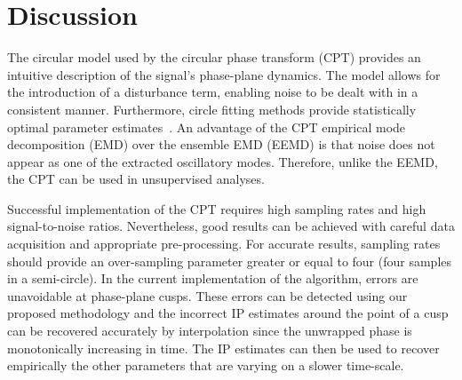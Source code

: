 \documentclass[11pt,draftcls,onecolumn]{IEEEtran}
\begin{document}
\section{Discussion}\label{sect:DiscussionSection}

The circular model used by the circular phase transform (CPT) provides an intuitive description of the signal's phase-plane dynamics. The model allows for the introduction of a disturbance term, enabling noise to be dealt with in a consistent manner. Furthermore, circle fitting methods provide statistically optimal parameter estimates~\cite{Al-Sharadqah2009}. An advantage of the CPT empirical mode decomposition (EMD) over the ensemble EMD (EEMD) is that noise does not appear as one of the extracted oscillatory modes. Therefore, unlike the EEMD, the CPT can be used in unsupervised analyses. %

 
Successful implementation of the CPT requires high sampling rates and high signal-to-noise ratios. Nevertheless, good results can be achieved with careful data acquisition and appropriate pre-processing. For accurate results, sampling rates should provide an over-sampling parameter greater or equal to four (four samples in a semi-circle). In the current implementation of the algorithm, errors are unavoidable at phase-plane cusps. These errors can be detected using our proposed methodology and the incorrect IP estimates around the point of a cusp can be recovered accurately by interpolation since the unwrapped phase is monotonically increasing in time. The IP estimates can then be used to recover empirically the other parameters that are varying on a slower time-scale. 
\end{document}
